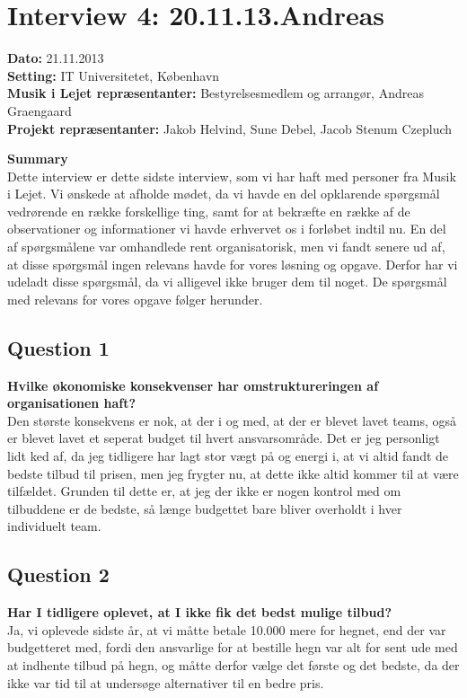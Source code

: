 \section{Interview 4: 20.11.13.Andreas}
\label{sec:interview_4}

\textbf{Dato:} 21.11.2013 \\
\textbf{Setting:} IT Universitetet, København \\
\textbf{Musik i Lejet repræsentanter:} Bestyrelsesmedlem og arrangør, Andreas Graengaard  \\
\textbf{Projekt repræsentanter:} Jakob Helvind, Sune Debel, Jacob Stenum Czepluch

\bigskip

\noindent \textbf{Summary} \\
Dette interview er dette sidste interview, som vi har haft med personer fra Musik i Lejet. Vi
ønskede at afholde mødet, da vi havde en del opklarende spørgsmål vedrørende en række forskellige
ting, samt for at bekræfte en række af de observationer og informationer vi havde erhvervet os i
forløbet indtil nu. En del af spørgsmålene var omhandlede \mil rent organisatorisk, men vi fandt
senere ud af, at disse spørgsmål ingen relevans havde for vores løsning og opgave. Derfor har vi
udeladt disse spørgsmål, da vi alligevel ikke bruger dem til noget. De spørgsmål med relevans for
vores opgave følger herunder.

\subsection{Question 1}
\label{sub:i4q1}
\noindent \textbf{Hvilke økonomiske konsekvenser har omstruktureringen af organisationen haft?} 
\\
Den største konsekvens er nok, at der i og med, at der er blevet lavet teams, også er blevet lavet
et seperat budget til hvert ansvarsområde. Det er jeg personligt lidt ked af, da jeg tidligere har
lagt stor vægt på og energi i, at vi altid fandt de bedste tilbud til prisen, men jeg frygter nu, at
dette ikke altid kommer til at være tilfældet. Grunden til dette er, at jeg der ikke er nogen
kontrol med om tilbuddene er de bedste, så længe budgettet bare bliver overholdt i hver individuelt
team.

\subsection{Question 2}
\label{sub:i4q2}
\noindent \textbf{Har I tidligere oplevet, at I ikke fik det bedst mulige tilbud?}
\\
Ja, vi oplevede sidste år, at vi måtte betale 10.000 mere for hegnet, end der var budgetteret med,
fordi den ansvarlige for at bestille hegn var alt for sent ude med at indhente tilbud på hegn, og
måtte derfor vælge det første og det bedste, da der ikke var tid til at undersøge alternativer til
en bedre pris.

